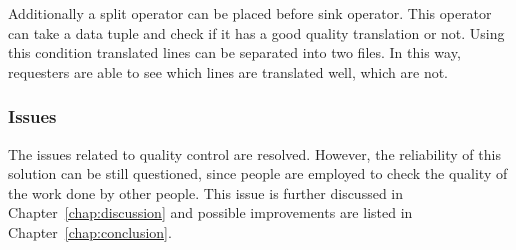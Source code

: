 Additionally a split operator can be placed before sink operator. This operator can take a data tuple and check if it has a good quality translation or not. Using this condition translated lines can be separated into two files. In this way, requesters are able to see which lines are translated well, which are not.

\subsubsection{Issues}
The issues related to quality control are resolved. However, the reliability of this solution can be still questioned, since people are employed to check the quality of the work done by other people. This issue is further discussed in Chapter~\ref{chap:discussion} and possible improvements are listed in Chapter~\ref{chap:conclusion}.